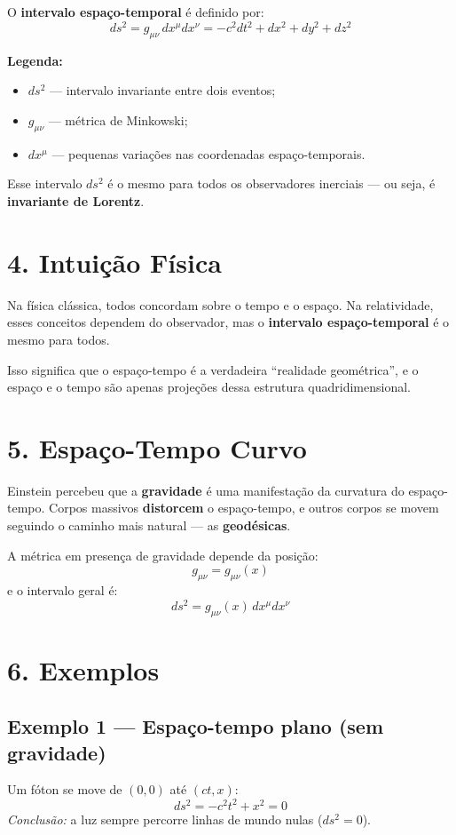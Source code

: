 \documentclass[a4paper,12pt]{article}
\begin{document}
O \textbf{intervalo espaço-temporal} é definido por:
\[
ds^2 = g_{\mu\nu}\, dx^{\mu} dx^{\nu} = -c^2 dt^2 + dx^2 + dy^2 + dz^2
\]

\textbf{Legenda:}
\begin{itemize}
    \item $ds^2$ — intervalo invariante entre dois eventos;
    \item $g_{\mu\nu}$ — métrica de Minkowski;
    \item $dx^{\mu}$ — pequenas variações nas coordenadas espaço-temporais.
\end{itemize}

Esse intervalo $ds^2$ é o mesmo para todos os observadores inerciais — ou seja, é \textbf{invariante de Lorentz}.

\section*{4. Intuição Física}

Na física clássica, todos concordam sobre o tempo e o espaço.  
Na relatividade, esses conceitos dependem do observador, mas o \textbf{intervalo espaço-temporal} é o mesmo para todos.

Isso significa que o espaço-tempo é a verdadeira “realidade geométrica”, e o espaço e o tempo são apenas projeções dessa estrutura quadridimensional.

\section*{5. Espaço-Tempo Curvo}

Einstein percebeu que a \textbf{gravidade} é uma manifestação da curvatura do espaço-tempo.  
Corpos massivos \textbf{distorcem} o espaço-tempo, e outros corpos se movem seguindo o caminho mais natural — as \textbf{geodésicas}.

A métrica em presença de gravidade depende da posição:
\[
g_{\mu\nu} = g_{\mu\nu}(x)
\]
e o intervalo geral é:
\[
ds^2 = g_{\mu\nu}(x) \, dx^{\mu} dx^{\nu}
\]

\section*{6. Exemplos}

\subsection*{Exemplo 1 — Espaço-tempo plano (sem gravidade)}
Um fóton se move de $(0,0)$ até $(ct,x)$:
\[
ds^2 = -c^2t^2 + x^2 = 0
\]
\textit{Conclusão:} a luz sempre percorre linhas de mundo nulas ($ds^2 = 0$).
\end{document}
